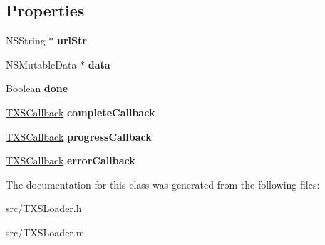 \subsection*{Properties}
\begin{DoxyCompactItemize}
\item 
\hypertarget{interface_t_x_s_loader_a946802d46d237d084ec19e4a98b6e3ed}{}N\+S\+String $\ast$ {\bfseries url\+Str}\label{interface_t_x_s_loader_a946802d46d237d084ec19e4a98b6e3ed}

\item 
\hypertarget{interface_t_x_s_loader_abe67e0c4eba32de918b4d54ef29b7920}{}N\+S\+Mutable\+Data $\ast$ {\bfseries data}\label{interface_t_x_s_loader_abe67e0c4eba32de918b4d54ef29b7920}

\item 
\hypertarget{interface_t_x_s_loader_aef57d065b49e47f73d88e1fd9a348e68}{}Boolean {\bfseries done}\label{interface_t_x_s_loader_aef57d065b49e47f73d88e1fd9a348e68}

\item 
\hypertarget{interface_t_x_s_loader_a857c4b0a05ce09cd6dc05a3a86f6c52f}{}\hyperlink{struct__tx__play__callback}{T\+X\+S\+Callback} {\bfseries complete\+Callback}\label{interface_t_x_s_loader_a857c4b0a05ce09cd6dc05a3a86f6c52f}

\item 
\hypertarget{interface_t_x_s_loader_a7e612bd8e1dd50e09eb1c1a78c0a3b4e}{}\hyperlink{struct__tx__play__callback}{T\+X\+S\+Callback} {\bfseries progress\+Callback}\label{interface_t_x_s_loader_a7e612bd8e1dd50e09eb1c1a78c0a3b4e}

\item 
\hypertarget{interface_t_x_s_loader_a561ff8a41acbbf96f6355fcc23c969db}{}\hyperlink{struct__tx__play__callback}{T\+X\+S\+Callback} {\bfseries error\+Callback}\label{interface_t_x_s_loader_a561ff8a41acbbf96f6355fcc23c969db}

\end{DoxyCompactItemize}


The documentation for this class was generated from the following files\+:\begin{DoxyCompactItemize}
\item 
src/T\+X\+S\+Loader.\+h\item 
src/T\+X\+S\+Loader.\+m\end{DoxyCompactItemize}
